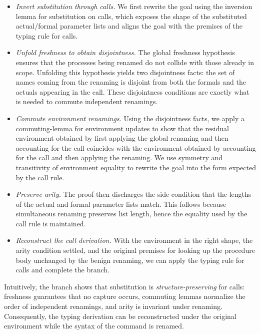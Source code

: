 \documentclass[12pt,a4paper,twoside]{book}
\begin{document}
\begin{itemize}
  \item \emph{Invert substitution through calls.} We first rewrite the goal using the inversion lemma for substitution on calls, which exposes the shape of the substituted actual/formal parameter lists and aligns the goal with the premises of the typing rule for calls.

  \item \emph{Unfold freshness to obtain disjointness.} The global freshness hypothesis ensures that the processes being renamed do not collide with those already in scope. Unfolding this hypothesis yields two disjointness facts: the set of names coming from the renaming is disjoint from both the formals and the actuals appearing in the call. These disjointness conditions are exactly what is needed to commute independent renamings.

  \item \emph{Commute environment renamings.} Using the disjointness facts, we apply a commuting-lemma for environment updates to show that the residual environment obtained by first applying the global renaming and then accounting for the call coincides with the environment obtained by accounting for the call and then applying the renaming. We use symmetry and transitivity of environment equality to rewrite the goal into the form expected by the call rule.

  \item \emph{Preserve arity.} The proof then discharges the side condition that the lengths of the actual and formal parameter lists match. This follows because simultaneous renaming preserves list length, hence the equality used by the call rule is maintained.

  \item \emph{Reconstruct the call derivation.} With the environment in the right shape, the arity condition settled, and the original premises for looking up the procedure body unchanged by the benign renaming, we can apply the typing rule for calls and complete the branch.
\end{itemize}

Intuitively, the branch shows that substitution is \emph{structure-preserving} for calls: freshness guarantees that no capture occurs, commuting lemmas normalize the order of independent renamings, and arity is invariant under renaming. Consequently, the typing derivation can be reconstructed under the original environment while the syntax of the command is renamed.
\end{document}
